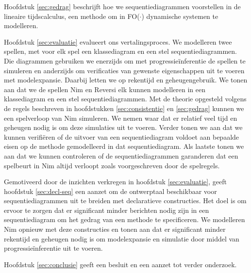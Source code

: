 \sloppy Hoofdstuk \ref{sec:gedrag} beschrijft hoe we sequentiediagrammen voorstellen in de lineaire tijdscalculus\cite{BogaertsBart2014Sdsu}, een methode om in FO($\cdot$) dynamische systemen te modelleren.

Hoofdstuk \ref{sec:evaluatie} evalueert ons vertalingsproces. We modelleren twee spellen, met voor elk spel een klassediagram en een stel sequentiediagrammen. Die diagrammen gebruiken we enerzijds om met progressie\"inferentie de spellen te simuleren en anderzijds om verificaties van gewenste eigenschappen uit te voeren met modelexpansie. Daarbij letten we op rekentijd en geheugengebruik. We tonen aan dat we de spellen Nim en Reversi elk kunnen modelleren in een klassediagram en een stel sequentiediagrammen. Met de theorie opgesteld volgens de regels beschreven in hoofdstukken \ref{sec:consistentie} en \ref{sec:gedrag} kunnen we een spelverloop van Nim simuleren. We nemen waar dat er relatief veel tijd en geheugen nodig is om deze simulaties uit te voeren. Verder tonen we aan dat we kunnen verifi\"eren of de uitvoer van een sequentiediagram voldoet aan bepaalde eisen op de methode gemodelleerd in dat sequentiediagram. Als laatste tonen we aan dat we kunnen controleren of de sequentiediagrammen garanderen dat een spelbeurt in Nim altijd verloopt zoals voorgeschreven door de spelregels.

Gemotiveerd door de inzichten verkregen in hoofdstuk \ref{sec:evaluatie}, geeft hoofdstuk \ref{sec:decl-seq} een aanzet om de ontwerptaal beschikbaar voor sequentiediagrammen uit te breiden met declaratieve constructies. Het doel is om ervoor te zorgen dat er significant minder berichten nodig zijn in een sequentiediagram om het gedrag van een methode te specificeren. We modelleren Nim opnieuw met deze constructies en tonen aan dat er significant minder rekentijd en geheugen nodig is om modelexpansie en simulatie door middel van progressie\"inferentie uit te voeren.

Hoofdstuk \ref{sec:conclusie} geeft een besluit en een aanzet tot verder onderzoek.